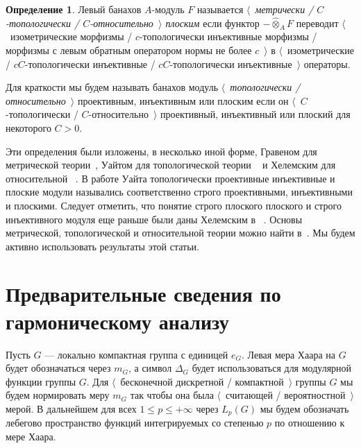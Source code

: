 \documentclass{article}
\numberwithin{equation}{section}
\theoremstyle{plain}
\theoremstyle{definition}
\newtheorem{definition}{Определение}
\newcommand{\projtens}{\mathbin{\widehat{\otimes}}}
\begin{document}
\begin{fulltext}
\begin{definition} Левый банахов $A$-модуль $F$ называется
\emph{$\langle$~метрически / $C$-топологически / $C$-относительно~$\rangle$
плоским} если функтор $-\projtens_A F$ переводит $\langle$~изометрические
морфизмы / $c$-топологически инъективные морфизмы / морфизмы с левым обратным
оператором нормы не более $c$~$\rangle$ в $\langle$~изометрические /
$cC$-топологически инъективные / $cC$-топологически инъективные~$\rangle$
операторы.
\end{definition}

Для краткости мы будем называть банахов модуль \emph{$\langle$~топологически /
относительно~$\rangle$} проективным, инъективным или плоским если он
$\langle$~$C$-топологически / $C$-относительно~$\rangle$ проективный,
инъективный или плоский для некоторого $C>0$.

Эти определения были изложены, в несколько иной форме, Гравеном для метрической
теории~\cite{GravInjProjBanMod},  Уайтом для топологической теории
~\cite{WhiteInjmoduAlg} и Хелемским для относительной
~\cite{HelemHomolDimNorModBanAlg}. В работе Уайта топологически проективные
инъективные и плоские модули назывались соответственно строго проективными,
инъективными и плоскими. Следует отметить, что понятие строго плоского плоского
и строго инъективного модуля еще раньше были даны Хелемским в
~\cite[параграф~VII.1]{HelBanLocConvAlg}. Основы метрической, топологической и
относительной теории можно найти в~\cite{NemGeomProjInjFlatBanMod}. Мы будем
активно использовать результаты этой статьи.


\section{Предварительные сведения по гармоническому
	анализу}\label{SectionPreliminariesOnHarmonicAnalysis} 

Пусть $G$ --- локально компактная группа с единицей $e_G$. Левая мера Хаара на
$G$ будет обозначаться через $m_G$, а символ $\Delta_G$ будет использоваться для
модулярной функции группы $G$. Для $\langle$~бесконечной дискретной /
компактной~$\rangle$ группы $G$ мы будем нормировать меру $m_G$ так чтобы она
была $\langle$~считающей / вероятностной~$\rangle$ мерой. В дальнейшем для всех
$1\leq p\leq+\infty$ через $L_p(G)$ мы будем обозначать лебегово пространство
функций интегрируемых со степенью $p$ по отношению к мере Хаара.


\end{fulltext}
\end{document}
